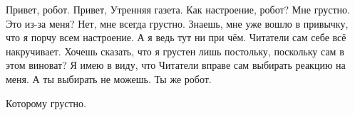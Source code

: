 \begin{dialog}
\X Привет, робот.
\R Привет, Утренняя газета.
\X Как настроение, робот?
\R Мне грустно.
\X Это из-за меня?
\R Нет, мне всегда грустно.
\X Знаешь, мне уже вошло в привычку, что я порчу всем настроение. А я ведь тут ни при чём. Читатели сам себе всё накручивает.
\R Хочешь сказать, что я грустен лишь постольку, поскольку сам в этом виноват?
\X Я имею в виду, что Читатели вправе сам выбирать реакцию на меня. А ты выбирать не можешь. Ты же робот.
\end{dialog}

\begin{monolog} %
\end{monolog} %

\begin{dialog}
\X Которому грустно.
\end{dialog}